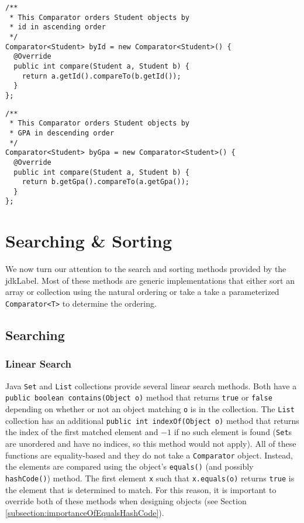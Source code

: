\begin{verbatim}
/**
 * This Comparator orders Student objects by 
 * id in ascending order
 */
Comparator<Student> byId = new Comparator<Student>() {
  @Override
  public int compare(Student a, Student b) {
  	return a.getId().compareTo(b.getId());
  }
};
\end{verbatim}

\begin{verbatim}
/**
 * This Comparator orders Student objects by 
 * GPA in descending order
 */
Comparator<Student> byGpa = new Comparator<Student>() {
  @Override
  public int compare(Student a, Student b) {
  	return b.getGpa().compareTo(a.getGpa());
  }
};
\end{verbatim}

\section{Searching \& Sorting}

We now turn our attention to the search and sorting methods provided by
the \gls{jdkLabel}.  Most of these methods are generic implementations 
that either sort an array or collection using the natural ordering or 
take a take a parameterized \texttt{Comparator<T>} to determine
the ordering.

\subsection{Searching}

\subsubsection{Linear Search}

Java \texttt{Set} and \texttt{List} collections provide
several linear search methods.  Both have a 
\texttt{public boolean contains(Object o)} method that returns
\texttt{true} or \texttt{false} depending on whether or
not an object matching \texttt{o} is in the collection.  
The \texttt{List} collection
has an additional \texttt{public int indexOf(Object o)} method
that returns the index of the first matched element and $-1$ if no such 
element is found (\texttt{Set}s
are unordered and have no indices, so this method would not apply).  
All of these functions are equality-based and they do not take a 
\texttt{Comparator} object.  Instead, the elements are compared
using the object's \texttt{equals()} (and possibly 
\texttt{hashCode()}) method.  The first element \texttt{x}
such that  \texttt{x.equals(o)} returns \texttt{true} 
is the element that is determined to match.  For this reason, it is important
to override both of these methods when designing objects (see Section \ref{subsection:importanceOfEqualsHashCode}).

